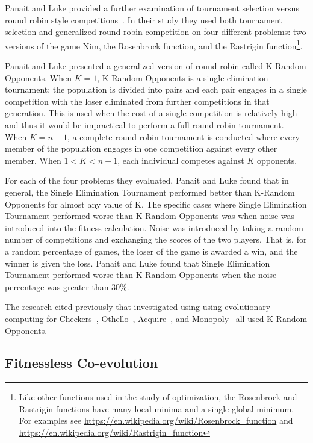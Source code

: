 Panait and Luke provided a further examination of tournament selection versus
round robin style competitions~\cite{Panait02acomparative}. In their study they
used both tournament selection and generalized round robin competition on four
different problems: two versions of the game Nim, the Rosenbrock function, and
the Rastrigin function\footnote{Like other functions used in the study of
optimization, the Rosenbrock and Rastrigin functions have many local minima and
a single global minimum. For examples see
\url{https://en.wikipedia.org/wiki/Rosenbrock_function} and
\url{https://en.wikipedia.org/wiki/Rastrigin_function}}.

Panait and Luke presented a generalized version of round robin called K-Random
Opponents. When \(K=1\), K-Random Opponents is a single elimination tournament:
the population is divided into pairs and each pair engages in a single
competition with the loser eliminated from further competitions in that
generation. This is used when the cost of a single competition is relatively
high and thus it would be impractical to perform a full round robin tournament.
When \(K=n-1\), a complete round robin tournament is conducted where every
member of the population engages in one competition against every other member.
When \(1 < K < n-1\), each individual competes against \(K\) opponents.

For each of the four problems they evaluated, Panait and Luke found that in
general, the Single Elimination Tournament performed better than K-Random
Opponents for almost any value of K. The specific cases where Single Elimination
Tournament performed worse than K-Random Opponents was when noise was introduced
into the fitness calculation. Noise was introduced by taking a random number of
competitions and exchanging the scores of the two players. That is, for a random
percentage of games, the loser of the game is awarded a win, and the winner is
given the loss. Panait and Luke found that Single Elimination Tournament
performed worse than K-Random Opponents when the noise percentage was greater
than 30\%.

The research cited previously that investigated using using evolutionary
computing for Checkers~\cite{Fogel2000Anaconda,journals/tec/ChellapillaF01},
Othello~\cite{ChongTW05}, Acquire~\cite{Anthony2002}, and
Monopoly~\cite{DBLP:conf/cig/Frayn05} all used K-Random Opponents.

\subsection{Fitnessless Co-evolution}

